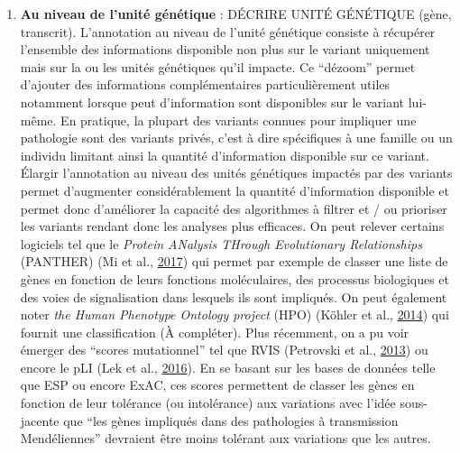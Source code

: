 \documentclass[12pt,twoside]{reedthesis}
\providecommand{\tightlist}{%
  \setlength{\itemsep}{0pt}\setlength{\parskip}{0pt}}
\theoremstyle{definition}
\theoremstyle{definition}
\theoremstyle{remark}
\begin{document}
  \begin{enumerate}
  \def\labelenumi{\arabic{enumi}.}
  \setcounter{enumi}{1}
  \tightlist
  \item
    \textbf{Au niveau de l'unité génétique} : DÉCRIRE UNITÉ GÉNÉTIQUE
    (gène, transcrit). L'annotation au niveau de l'unité génétique
    consiste à récupérer l'ensemble des informations disponible non plus
    sur le variant uniquement mais sur la ou les unités génétiques qu'il
    impacte. Ce ``dézoom'' permet d'ajouter des informations
    complémentaires particulièrement utiles notamment lorsque peut
    d'information sont disponibles sur le variant lui-même. En pratique,
    la plupart des variants connues pour impliquer une pathologie sont des
    variants privés, c'est à dire spécifiques à une famille ou un individu
    limitant ainsi la quantité d'information disponible sur ce variant.
    Élargir l'annotation au niveau des unités génétiques impactés par des
    variants permet d'augmenter considérablement la quantité d'information
    disponible et permet donc d'améliorer la capacité des algorithmes à
    filtrer et / ou prioriser les variants rendant donc les analyses plus
    efficaces. On peut relever certains logiciels tel que le \emph{Protein
    ANalysis THrough Evolutionary Relationships} (PANTHER) (Mi et al.,
    \protect\hyperlink{ref-Mi2017}{2017}) qui permet par exemple de
    classer une liste de gènes en fonction de leurs fonctions
    moléculaires, des processus biologiques et des voies de signalisation
    dans lesquels ils sont impliqués. On peut également noter \emph{the
    Human Phenotype Ontology project} (HPO) (Köhler et al.,
    \protect\hyperlink{ref-Kohler2014}{2014}) qui fournit une
    classification (À compléter). Plus récemment, on a pu voir émerger des
    ``scores mutationnel'' tel que RVIS (Petrovski et al.,
    \protect\hyperlink{ref-Petrovski2013}{2013}) ou encore le pLI (Lek et
    al., \protect\hyperlink{ref-Lek2016}{2016}). En se basant sur les
    bases de données telle que ESP ou encore ExAC, ces scores permettent
    de classer les gènes en fonction de leur tolérance (ou intolérance)
    aux variations avec l'idée sous-jacente que ``les gènes impliqués dans
    des pathologies à transmission Mendéliennes'' devraient être moins
    tolérant aux variations que les autres.
  \end{enumerate}
  
\end{document}
